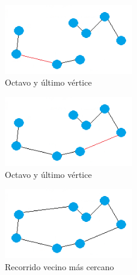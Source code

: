 \begin{frame}
	\begin{exampleblock}{ } 
	\begin{figure}[htbH] 
		\centering
		\includegraphics[width=0.5\textwidth]{./Imagenes/arista7.png}
		\caption{Octavo y último vértice} 
	\end{figure}
	\end{exampleblock}
\end{frame}


\begin{frame}
	\begin{exampleblock}{ } 
	\begin{figure}[htbH] 
		\centering
		\includegraphics[width=0.5\textwidth]{./Imagenes/arista8.png}
		\caption{Octavo y último vértice} 
	\end{figure}
	\end{exampleblock}
\end{frame}

\begin{frame}
	\begin{exampleblock}{ }
	\begin{figure}[htbH] 
		\centering
		\includegraphics[width=0.5\textwidth]{./Imagenes/arista9.png}
		\caption{Recorrido vecino más cercano} 
	\end{figure}
	\end{exampleblock}
\end{frame}



